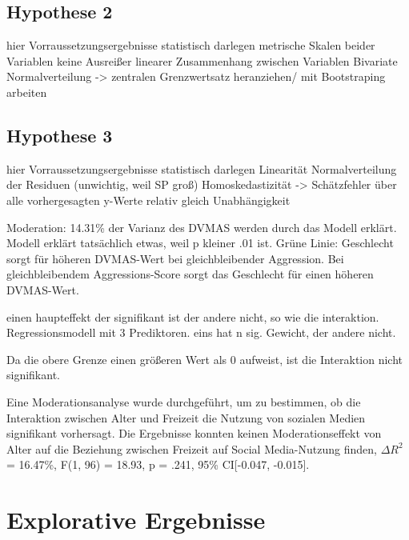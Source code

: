 \subsection{Hypothese 2}    \label{subsec_4.3.2}
hier Vorraussetzungsergebnisse statistisch darlegen
metrische Skalen beider Variablen
keine Ausreißer
linearer Zusammenhang zwischen Variablen
Bivariate Normalverteilung -> zentralen Grenzwertsatz heranziehen/ mit Bootstraping arbeiten


\subsection{Hypothese 3}    \label{subsec_4.3.3}
hier Vorraussetzungsergebnisse statistisch darlegen
Linearität
Normalverteilung der Residuen (unwichtig, weil SP groß)
Homoskedastizität -> Schätzfehler über alle vorhergesagten y-Werte relativ gleich
Unabhängigkeit






Moderation: 14.31\% der Varianz des DVMAS werden durch das Modell erklärt.
Modell erklärt tatsächlich etwas, weil p kleiner .01 ist.
Grüne Linie: Geschlecht sorgt für höheren DVMAS-Wert bei gleichbleibender Aggression. Bei gleichbleibendem Aggressions-Score sorgt das Geschlecht für einen höheren DVMAS-Wert.

einen haupteffekt der signifikant ist der andere nicht, so wie die interaktion. Regressionsmodell mit 3 Prediktoren. eins hat n sig. Gewicht, der andere nicht.

Da die obere Grenze einen größeren Wert als 0 aufweist, ist die Interaktion nicht signifikant.

Eine Moderationsanalyse wurde durchgeführt, um zu bestimmen, ob die Interaktion zwischen Alter und Freizeit die Nutzung von sozialen Medien signifikant vorhersagt. Die Ergebnisse konnten keinen Moderationseffekt von Alter auf die Beziehung zwischen Freizeit auf Social Media-Nutzung finden, $\Delta R^{2}$ = 16.47\%, F(1, 96) = 18.93, p = .241, 95\% CI[-0.047, -0.015].


\section{Explorative Ergebnisse}    \label{sec_4.4}

